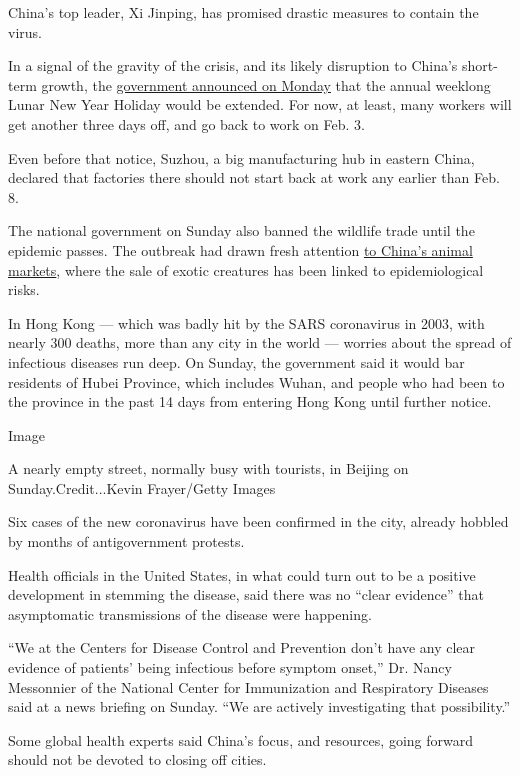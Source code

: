China's top leader, Xi Jinping, has promised drastic measures to contain
the virus.

In a signal of the gravity of the crisis, and its likely disruption to
China's short-term growth, the
\href{https://news.sina.com.cn/c/2020-01-27/doc-iihnzahk6491235.shtml}{government
announced on Monday} that the annual weeklong Lunar New Year Holiday
would be extended. For now, at least, many workers will get another
three days off, and go back to work on Feb. 3.

Even before that notice, Suzhou, a big manufacturing hub in eastern
China, declared that factories there should not start back at work any
earlier than Feb. 8.

The national government on Sunday also banned the wildlife trade until
the epidemic passes. The outbreak had drawn fresh attention
\href{https://www.nytimes.com/2020/01/25/world/asia/china-markets-coronavirus-sars.html}{to
China's animal markets}, where the sale of exotic creatures has been
linked to epidemiological risks.

In Hong Kong --- which was badly hit by the SARS coronavirus in 2003,
with nearly 300 deaths, more than any city in the world --- worries
about the spread of infectious diseases run deep. On Sunday, the
government said it would bar residents of Hubei Province, which includes
Wuhan, and people who had been to the province in the past 14 days from
entering Hong Kong until further notice.

Image

A nearly empty street, normally busy with tourists, in Beijing on
Sunday.Credit...Kevin Frayer/Getty Images

Six cases of the new coronavirus have been confirmed in the city,
already hobbled by months of antigovernment protests.

Health officials in the United States, in what could turn out to be a
positive development in stemming the disease, said there was no ``clear
evidence'' that asymptomatic transmissions of the disease were
happening.

``We at the Centers for Disease Control and Prevention don't have any
clear evidence of patients' being infectious before symptom onset,'' Dr.
Nancy Messonnier of the National Center for Immunization and Respiratory
Diseases said at a news briefing on Sunday. ``We are actively
investigating that possibility.''

Some global health experts said China's focus, and resources, going
forward should not be devoted to closing off cities.

